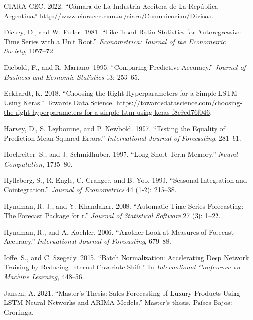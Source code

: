 \documentclass[
  12pt, a4paper, oneside]{article}
\newlength{\cslhangindent}
\newenvironment{CSLReferences}[2] %
 {\begin{list}{}{%
  \setlength{\itemindent}{0pt}
  \setlength{\leftmargin}{0pt}
  \setlength{\parsep}{0pt}
  \ifodd #1
   \setlength{\leftmargin}{\cslhangindent}
   \setlength{\itemindent}{-1\cslhangindent}
  \fi
  \setlength{\itemsep}{#2\baselineskip}}}
 {\end{list}}
\begin{document}
\begin{CSLReferences}{1}{0}
CIARA-CEC. 2022. {``Cámara de La Industria Aceitera de La República Argentina.''} \url{http://www.ciaracec.com.ar/ciara/Comunicación/Divisas}.

Dickey, D., and W. Fuller. 1981. {``Likelihood Ratio Statistics for Autoregressive Time Series with a Unit Root.''} \emph{Econometrica: Journal of the Econometric Society}, 1057--72.

Diebold, F., and R. Mariano. 1995. {``Comparing Predictive Accuracy.''} \emph{Journal of Business and Economic Statistics} 13: 253--65.

Eckhardt, K. 2018. {``Choosing the Right Hyperparameters for a Simple LSTM Using Keras.''} Towards Data Science. \url{https://towardsdatascience.com/choosing-the-right-hyperparameters-for-a-simple-lstm-using-keras-f8e9ed76f046}.

Harvey, D., S. Leybourne, and P. Newbold. 1997. {``Testing the Equality of Prediction Mean Squared Errors.''} \emph{International Journal of Forecasting}, 281--91.

Hochreiter, S., and J. Schmidhuber. 1997. {``Long Short-Term Memory.''} \emph{Neural Computation}, 1735--80.

Hylleberg, S., R. Engle, C. Granger, and B. Yoo. 1990. {``Seasonal Integration and Cointegration.''} \emph{Journal of Econometrics} 44 (1-2): 215--38.

Hyndman, R. J., and Y. Khandakar. 2008. {``Automatic Time Series Forecasting: The Forecast Package for r.''} \emph{Journal of Statistical Software} 27 (3): 1--22.

Hyndman, R., and A. Koehler. 2006. {``Another Look at Measures of Forecast Accuracy.''} \emph{International Journal of Forecasting}, 679--88.

Ioffe, S., and C. Szegedy. 2015. {``Batch Normalization: Accelerating Deep Network Training by Reducing Internal Covariate Shift.''} In \emph{International Conference on Machine Learning}, 448--56.

Jansen, A. 2021. {``Master's Thesis: Sales Forecasting of Luxury Products Using LSTM Neural Networks and ARIMA Models.''} Master's thesis, Países Bajos: Groninga.


\end{CSLReferences}
\end{document}
